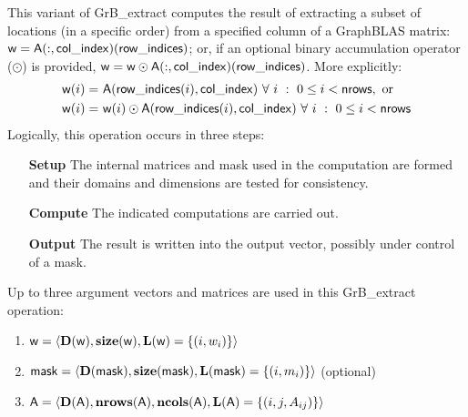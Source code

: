 This variant of {\sf GrB\_extract} computes the result of extracting a subset of
locations (in a specific order) from a specified column of a GraphBLAS matrix: 
${\sf w} = {\sf A}(:,{\sf col\_index})({\sf row\_indices})$; or, if an 
optional binary accumulation operator ($\odot$) is provided, 
${\sf w} = {\sf w} \odot {\sf A}(:,{\sf col\_index})({\sf row\_indices})$.  
More explicitly:
\[
\begin{aligned}
    {\sf w}(i) = &\ {\sf A}({\sf row\_indices}(i),{\sf col\_index}) 
    \ \forall \ i \ : \ 0 \leq i < {\sf nrows}, \mbox{~or~}
    \\
    {\sf w}(i) = &\ {\sf w}(i) \odot {\sf A}({\sf row\_indices}(i),{\sf col\_index})
    \ \forall \ i \ : \ 0 \leq i < {\sf nrows}
\end{aligned}
\]  
Logically, this operation occurs in three steps:
\begin{enumerate}[leftmargin=0.75in]
\item[\bf Setup] The internal matrices and mask used in the computation are formed 
and their domains and dimensions are tested for consistency.
\item[\bf Compute] The indicated computations are carried out.
\item[\bf Output] The result is written into the output vector, possibly under 
control of a mask.
\end{enumerate}

Up to three argument vectors and matrices are used in this {\sf GrB\_extract} 
operation:
\begin{enumerate}
	\item ${\sf w} = \langle \bold{D}({\sf w}),\bold{size}({\sf w}),
    \bold{L}({\sf w}) = \{(i,w_{i}) \} \rangle$
    
	\item ${\sf mask} = \langle \bold{D}({\sf mask}),\bold{size}({\sf mask}),
    \bold{L}({\sf mask}) = \{(i,m_{i}) \} \rangle$ (optional)

	\item ${\sf A} = \langle \bold{D}({\sf A}),\bold{nrows}({\sf A}),
    \bold{ncols}({\sf A}),\bold{L}({\sf A}) = \{(i,j,A_{ij}) \} \rangle$
\end{enumerate}

